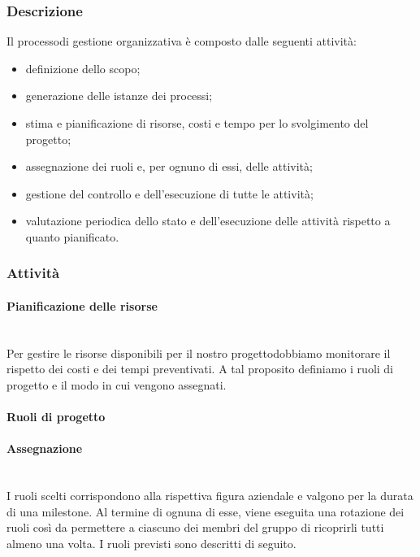 		\subsubsection{Descrizione}
			Il processo\glosp di gestione organizzativa è composto dalle seguenti attività:
			\begin{itemize}
				\item definizione dello scopo;
				\item generazione delle istanze dei processi\glo;
				\item stima e pianificazione di risorse, costi e tempo per lo svolgimento del progetto\glo;
				\item assegnazione dei ruoli e, per ognuno di essi, delle attività;
				\item gestione del controllo e dell'esecuzione di tutte le attività;
				\item valutazione periodica dello stato e dell'esecuzione delle attività rispetto a quanto pianificato.
			\end{itemize}			
		\subsubsection{Attività}
		\paragraph{Pianificazione delle risorse}\mbox{}\\ [1mm]
		Per gestire le risorse disponibili per il nostro progetto\glosp dobbiamo monitorare il rispetto dei costi e dei tempi preventivati. A tal proposito definiamo i ruoli di progetto e il modo in cui vengono assegnati.
		\paragraph{Ruoli di progetto}
		
			\paragraph*{Assegnazione}\mbox{}\\ [1mm]
				I ruoli scelti corrispondono alla rispettiva figura aziendale e valgono per la durata di una milestone. Al termine di ognuna di esse, viene eseguita una rotazione dei ruoli così da permettere a ciascuno dei membri del gruppo di ricoprirli tutti almeno una volta.
				I ruoli previsti sono descritti di seguito.
